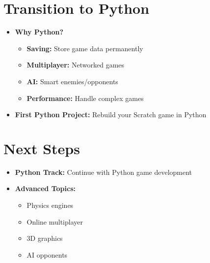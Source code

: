 \documentclass{article}
\begin{document}
\section{Transition to Python}
\begin{itemize}[nosep, leftmargin=*]
\item \textbf{Why Python?} 
    \begin{itemize}
    \item \textbf{Saving:} Store game data permanently
    \item \textbf{Multiplayer:} Networked games
    \item \textbf{AI:} Smart enemies/opponents
    \item \textbf{Performance:} Handle complex games
    \end{itemize}
\item \textbf{First Python Project:} Rebuild your Scratch game in Python
\end{itemize}

\section{Next Steps}
\begin{itemize}[nosep, leftmargin=*]
\item \textbf{Python Track:} Continue with Python game development
\item \textbf{Advanced Topics:} 
    \begin{itemize}
    \item Physics engines
    \item Online multiplayer
    \item 3D graphics
    \item AI opponents
    \end{itemize}
\end{itemize}

\vspace{1em}
\noindent{}
\end{document}
